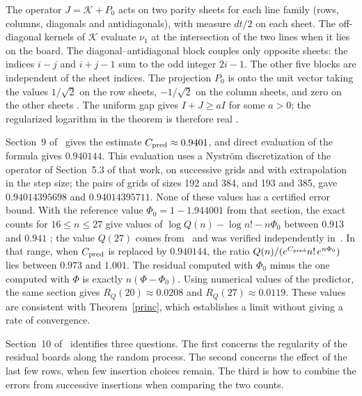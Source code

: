 The operator $J=\mathcal K+P_0$ acts on two parity sheets for each line family (rows, columns,
diagonals and antidiagonals), with measure $dt/2$ on each sheet. The off-diagonal kernels of
$\mathcal K$ evaluate $\nu_1$ at the intersection of the two lines when it lies on the board.
The diagonal--antidiagonal block couples only opposite sheets: the indices $i-j$ and $i+j-1$
sum to the odd integer $2i-1$. The other five blocks are independent of the sheet indices.
The projection $P_0$ is onto the unit vector taking the values $1/\sqrt2$ on the row sheets,
$-1/\sqrt2$ on the column sheets, and zero on the other sheets
\cite[\S5.3, (D3.4)--(D3.6)]{pred}. The uniform gap gives $I+J\ge aI$ for some $a>0$;
the regularized logarithm in the theorem is therefore real \cite[\S5.4, (D4.1)]{pred}.

Section~9 of~\cite{pred} gives the estimate $C_{\rm pred}\approx0.9401$, and direct evaluation of
the formula gives $0.940144$. This evaluation \cite[Section~9, ``Direct evaluation of the
formula'']{pred} uses a Nyström discretization of the operator of Section~5.3 of that work, on
successive grids and with extrapolation in the step size; the pairs of grids of sizes 192 and 384,
and 193 and 385, gave $0.94014395698$ and $0.94014395711$. None of these values has a certified
error bound. With the reference value
$\Phi_0=1-1.944001$ from that section, the exact counts for $16\le n\le27$ \cite{oeis} give
values of $\log Q(n)-\log n!-n\Phi_0$ between $0.913$ and $0.941$ \cite[Table~2]{pred}; the value
$Q(27)$ comes from~\cite{q27} and was verified independently in~\cite{yaoli}. In that range, when
$C_{\rm pred}$ is replaced by $0.940144$, the ratio $Q(n)/(e^{C_{\rm pred}}n!\,e^{n\Phi_0})$ lies
between $0.973$ and $1.001$. The residual computed with $\Phi_0$ minus the one computed with
$\Phi$ is exactly $n(\Phi-\Phi_0)$. Using numerical
values of the predictor, the same section gives $R_Q(20)\approx0.0208$ and $R_Q(27)\approx0.0119$.
These values are consistent with Theorem~\ref{princ}, which establishes a limit without giving a
rate of convergence.

Section~10 of~\cite{pred} identifies three questions. The first concerns the regularity of the
residual boards along the random process. The second concerns the effect of the last few rows, when
few insertion choices remain. The third is how to combine the errors from successive insertions
when comparing the two counts.

